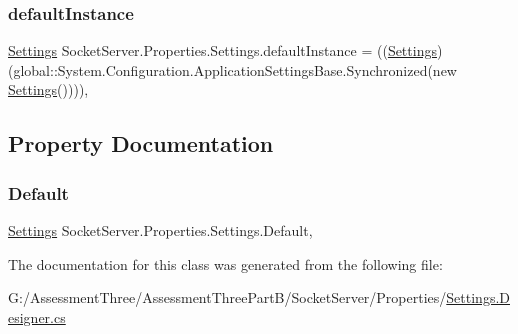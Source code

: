 \subsubsection{\texorpdfstring{default\+Instance}{defaultInstance}}
{\footnotesize\ttfamily \hyperlink{class_socket_server_1_1_properties_1_1_settings}{Settings} Socket\+Server.\+Properties.\+Settings.\+default\+Instance = ((\hyperlink{class_socket_server_1_1_properties_1_1_settings}{Settings})(global\+::\+System.\+Configuration.\+Application\+Settings\+Base.\+Synchronized(new \hyperlink{class_socket_server_1_1_properties_1_1_settings}{Settings}())))\hspace{0.3cm}{\ttfamily [static]}, {\ttfamily [private]}}



\subsection{Property Documentation}
\mbox{\label{class_socket_server_1_1_properties_1_1_settings_a7944b37c40f557280d233c0cfa179c2d}} 
\subsubsection{\texorpdfstring{Default}{Default}}
{\footnotesize\ttfamily \hyperlink{class_socket_server_1_1_properties_1_1_settings}{Settings} Socket\+Server.\+Properties.\+Settings.\+Default\hspace{0.3cm}{\ttfamily [static]}, {\ttfamily [get]}}



The documentation for this class was generated from the following file\+:\begin{DoxyCompactItemize}
\item 
G\+:/\+Assessment\+Three/\+Assessment\+Three\+Part\+B/\+Socket\+Server/\+Properties/\hyperlink{_socket_server_2_properties_2_settings_8_designer_8cs}{Settings.\+Designer.\+cs}\end{DoxyCompactItemize}
